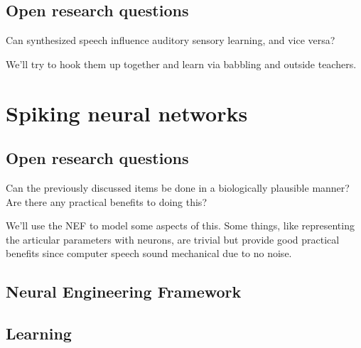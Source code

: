 \documentclass{article}
\begin{document}
\subsection{Open research questions}

Can synthesized speech
influence auditory sensory learning,
and vice versa?

We'll try to hook them up together
and learn via babbling and outside teachers.

\section{Spiking neural networks}

\subsection{Open research questions}

Can the previously discussed items
be done in a biologically plausible manner?
Are there any practical benefits to doing this?

We'll use the NEF to model some aspects of this.
Some things,
like representing the articular parameters with neurons,
are trivial but provide good practical benefits
since computer speech sound mechanical due to no noise.

\subsection{Neural Engineering Framework}

\subsection{Learning}
\end{document}
